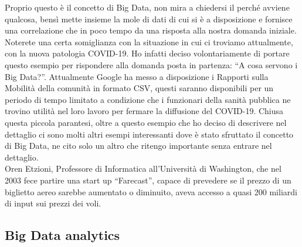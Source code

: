Proprio questo \`e il concetto di Big Data, non mira a chiedersi il perch\'e avviene qualcosa, bens\`i mette insieme la mole di dati di cui si \`e a disposizione e fornisce una correlazione che in poco tempo da una risposta alla nostra domanda iniziale.\\
Noterete una certa somiglianza con la situazione in cui ci troviamo attualmente, con la nuova patologia COVID-19. Ho infatti deciso volontariamente di portare questo esempio per rispondere alla domanda posta in partenza: ``A cosa servono i Big Data?''. Attualmente Google ha messo a disposizione i Rapporti sulla Mobilit\`a della comunit\`a in formato CSV, questi saranno disponibili per un periodo di tempo limitato a condizione che i funzionari della sanit\`a pubblica ne trovino utilit\`a nel loro lavoro per fermare la diffusione del COVID-19. Chiusa questa piccola parantesi, oltre a questo esempio che ho deciso di descrivere nel dettaglio ci sono molti altri esempi interessanti dove \`e stato sfruttato il concetto di Big Data, ne cito solo un altro che ritengo importante senza entrare nel dettaglio.\\
Oren Etzioni, Professore di Informatica all'Universit\`a di Washington, che nel 2003 fece partire una start up ``Farecast'', capace di prevedere se il prezzo di un biglietto aereo sarebbe aumentato o diminuito, aveva accesso a quasi 200 miliardi di input sui prezzi dei voli.

\subsection{Big Data analytics}

